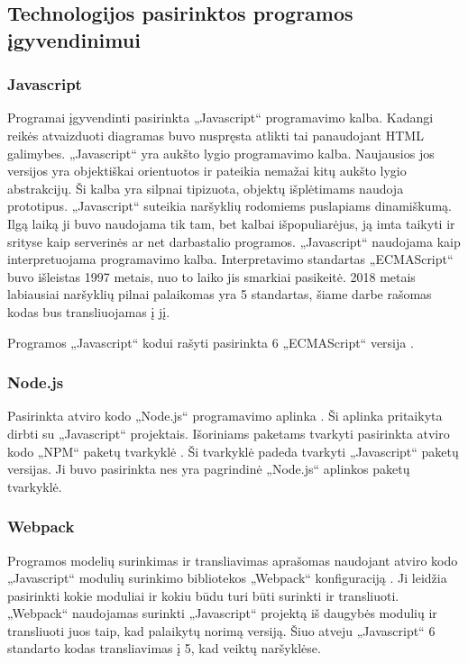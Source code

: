 \subsection{Technologijos pasirinktos programos įgyvendinimui}

\subsubsection{Javascript}

Programai įgyvendinti pasirinkta „Javascript“ programavimo kalba. Kadangi reikės atvaizduoti diagramas buvo nuspręsta atlikti tai panaudojant HTML galimybes.  „Javascript“ yra aukšto lygio programavimo kalba. Naujausios jos versijos yra objektiškai orientuotos ir pateikia nemažai kitų aukšto lygio abstrakcijų. Ši kalba yra silpnai tipizuota, objektų išplėtimams naudoja prototipus. „Javascript“ suteikia naršyklių rodomiems puslapiams dinamiškumą. Ilgą laiką ji buvo naudojama tik tam, bet kalbai išpopuliarėjus, ją imta taikyti ir srityse kaip serverinės ar net darbastalio programos. „Javascript“ naudojama kaip interpretuojama programavimo kalba. Interpretavimo standartas „ECMAScript“ buvo išleistas 1997 metais, nuo to laiko jis smarkiai pasikeitė. 2018 metais labiausiai naršyklių pilnai palaikomas yra 5 standartas, šiame darbe rašomas kodas bus transliuojamas į jį.

Programos „Javascript“ kodui rašyti pasirinkta 6 „ECMAScript“ versija \cite{EcmaScript}.

\subsubsection{Node.js}

Pasirinkta atviro kodo „Node.js“ programavimo aplinka \cite{nodeJs}. Ši aplinka pritaikyta dirbti su „Javascript“ projektais. Išoriniams paketams tvarkyti pasirinkta atviro kodo „NPM“ paketų tvarkyklė \cite{npmWebsite}. Ši tvarkyklė padeda tvarkyti „Javascript“ paketų versijas. Ji buvo pasirinkta nes yra pagrindinė „Node.js“ aplinkos paketų tvarkyklė.


\subsubsection{Webpack}

Programos modelių surinkimas ir transliavimas aprašomas naudojant atviro kodo „Javascript“ modulių surinkimo bibliotekos „Webpack“ konfiguraciją \cite{webpack}. Ji leidžia pasirinkti kokie moduliai ir kokiu būdu turi būti surinkti ir transliuoti. „Webpack“ naudojamas surinkti „Javascript“ projektą iš daugybės modulių ir transliuoti juos taip, kad palaikytų norimą versiją. Šiuo atveju „Javascript“ 6 standarto kodas transliavimas į 5, kad veiktų naršyklėse.

